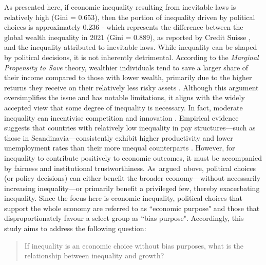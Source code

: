 \documentclass[12pt]{article}
\begin{document}
As presented here, if economic inequality resulting from inevitable laws is relatively high (Gini = 0.653), then the portion of inequality driven by political choices is approximately 0.236 - which represents the difference between the global wealth inequality in 2021 (Gini = 0.889), as reported by Credit Suisse \parencite{suisse2022global}, and the inequality attributed to inevitable laws. While inequality can be shaped by political decisions, it is not inherently detrimental.  According to the \textit{Marginal Propensity to Save} theory, wealthier individuals tend to save a larger share of their income compared to those with lower wealth, primarily due to the higher returns they receive on their relatively less risky assets \parencite{fagereng2020heterogeneity}. Although this argument oversimplifies the issue and has notable limitations, it aligns with the widely accepted view that some degree of inequality is necessary. In fact, moderate inequality can incentivise competition and innovation \parencite{balietti2021incentives}. Empirical evidence suggests that countries with relatively low inequality in pay structures—such as those in Scandinavia—consistently exhibit higher productivity and lower unemployment rates than their more unequal counterparts \parencite{galbraith2016inequality}. However, for inequality to contribute positively to economic outcomes, it must be accompanied by fairness and institutional trustworthiness.  As argued above, political choices (or policy decisions) can either benefit the broader economy—without necessarily increasing inequality—or primarily benefit a privileged few, thereby exacerbating inequality. Since the focus here is economic inequality, political choices that support the whole economy are referred to as ``economic purpose" and those that disproportionately favour a select group as ``bias purpose". Accordingly, this study aims to address the following question:  
\begin{quote}
If inequality is an economic choice without bias purposes, what is the relationship between inequality and growth?
\end{quote}
\end{document}
